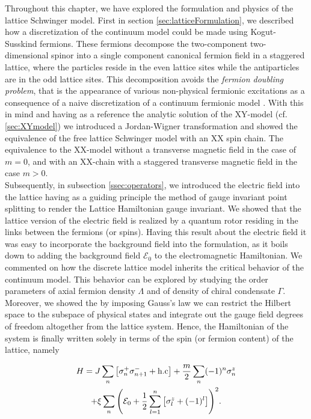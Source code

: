 Throughout this chapter, we have explored the formulation and physics of the lattice Schwinger model. First in section \ref{sec:latticeFormulation}, we described how a discretization of the continuum model could be made using Kogut-Susskind fermions. These fermions decompose the two-component two-dimensional spinor into a single component canonical fermion field in a staggered lattice, where the particles reside in the even lattice sites while the antiparticles are in the odd lattice sites. This decomposition avoids the \emph{fermion doubling problem}, that is the appearance of various non-physical fermionic excitations as a consequence of a naive discretization of a continuum fermionic model \cite{Susskind1977}. With this in mind and having as a reference the analytic solution of the XY-model (cf. \ref{sec:XYmodel}) we introduced a Jordan-Wigner transformation and showed the equivalence of the free lattice Schwinger model with an XX spin chain. The equivalence to the XX-model without a transverse magnetic field in the case of $m=0$, and with an XX-chain with a staggered transverse magnetic field in the case $m>0$.\\

Subsequently, in subsection \ref{ssec:operators}, we introduced the electric field into the lattice having as a guiding principle the method of gauge invariant point splitting to render the Lattice Hamiltonian gauge invariant. We showed that the lattice version of the electric field is realized by a quantum rotor residing in the links between the fermions (or spins). Having this result about the electric field it was easy to incorporate the background field into the formulation, as it boils down to adding the background field $\mathcal{E}_0$ to the electromagnetic Hamiltonian. We commented on how the discrete lattice model inherits the critical behavior of the continuum model. This behavior can be explored by studying the order parameters of axial fermion density $\Lambda$ and of density of chiral condensate $\Gamma$.\\

Moreover, we showed the by imposing Gauss's law we can restrict the Hilbert space to the subspace of physical states and integrate out the gauge field degrees of freedom altogether from the lattice system. Hence, the Hamiltonian of the system is finally written solely in terms of the spin (or fermion content) of the lattice, namely

\begin{multline*}
	H = J\sum_n\qty[\sigma^+_n \sigma^-_{n+1} + \text{h.c}] + \frac{m}{2}\sum_n (-1)^n\sigma^z_n \\
	+ \xi \sum_n \qty(\mathcal{E}_0 + \frac{1}{2}\sum_{l=1}^{n}\qty[\sigma^z_l + (-1)^l])^2.
\end{multline*}

